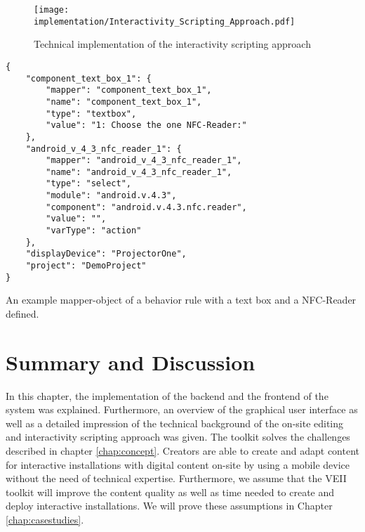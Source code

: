\begin{figure}[H]
  \begin{center}
    \texttt{[image: implementation/Interactivity\_Scripting\_Approach.pdf]}
    \caption{Technical implementation of the interactivity scripting approach}
    \label{fig:isa}
  \end{center}
\end{figure}


\begin{Listing}[H]
\begin{lstlisting}
{
    "component_text_box_1": {
        "mapper": "component_text_box_1",
        "name": "component_text_box_1",
        "type": "textbox",
        "value": "1: Choose the one NFC-Reader:"
    },
    "android_v_4_3_nfc_reader_1": {
        "mapper": "android_v_4_3_nfc_reader_1",
        "name": "android_v_4_3_nfc_reader_1",
        "type": "select",
        "module": "android.v.4.3",
        "component": "android.v.4.3.nfc.reader",
        "value": "",
        "varType": "action"
    },
    "displayDevice": "ProjectorOne",
    "project": "DemoProject"
}
\end{lstlisting}
\caption{An example mapper-object of a behavior rule with a text box and a NFC-Reader defined.}
\label{lst:json-mapper}
\end{Listing}

\section{Summary and Discussion}
In this chapter, the implementation of the backend and the frontend of the system was explained. Furthermore, an overview of the graphical user interface as well as a detailed impression of the technical background of the on-site editing and interactivity scripting approach was given. The toolkit solves the challenges described in chapter \ref{chap:concept}. Creators are able to create and adapt content for interactive installations with digital content on-site by using a mobile device without the need of technical expertise. Furthermore, we assume that the VEII toolkit will improve the content quality as well as time needed to create and deploy interactive installations. We will prove these assumptions in Chapter \ref{chap:casestudies}.

